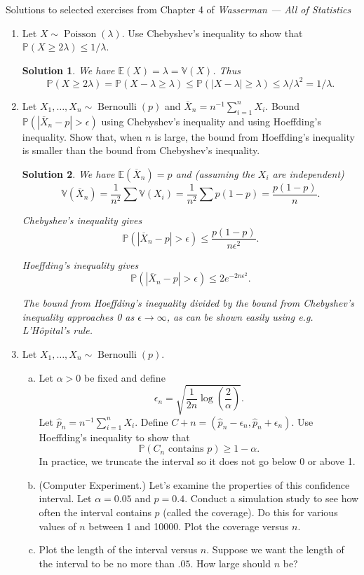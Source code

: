 \documentclass[10pt]{article}
\newtheorem*{sol}{Solution}
\renewcommand{\P}{\mathbb{P}}
\newcommand{\V}{\mathbb{V}}
\newcommand{\E}{\mathbb{E}}
\newcommand{\Bern}{\operatorname{Bernoulli}}
\newcommand{\Poiss}{\operatorname{Poisson}}
\begin{document}
\noindent \large{Solutions to selected exercises from Chapter 4 of
\emph{Wasserman --- All of Statistics}}

\begin{enumerate}
\item[(2)] Let $X\sim \Poiss(\lambda)$. Use Chebyshev's inequality to show that
$\P(X\geq 2\lambda) \leq 1/\lambda$.

\begin{sol}
We have $\E(X)=\lambda=\V(X)$. Thus
\[
\P(X\geq 2\lambda) =\P(X-\lambda\geq \lambda)\leq \P(|X-\lambda|\geq \lambda)
\leq \lambda / \lambda^2=1/\lambda.
\]
\end{sol}

\item[(3)] Let $X_1,\ldots,X_n\sim\Bern(p)$ and $\overline X_n = n^{-1}\sum_{i=1}^n X_i$.
Bound $\P(|\overline X_n - p|>\epsilon)$ using Chebyshev's inequality and
using Hoeffding's inequality.
Show that, when $n$ is large, the bound from Hoeffding's inequality is
smaller than the bound from Chebyshev's inequality.

\begin{sol}
We have $\E(\overline X_n)=p$ and (assuming the $X_i$ are independent)
\[
\V(\overline X_n) = \frac{1}{n^2} \sum \V(X_i) = \frac{1}{n^2} \sum p(1-p) =
\frac{p(1-p)}{n}.
\]

Chebyshev's inequality gives
\[
\P(|\overline X_n - p| > \epsilon) \leq \frac{p(1-p)}{n\epsilon^2}.
\]

Hoeffding's inequality gives
\[
\P(|\overline X_n - p| > \epsilon) \leq 2e^{-2n\epsilon^2}.
\]

The bound from Hoeffding's inequality divided by the bound from Chebyshev's
inequality approaches 0 as $\epsilon\to \infty$, as can be shown easily using
e.g. L'H\^opital's rule.
\end{sol}

\item[(4)] Let $X_1,\ldots,X_n \sim \Bern(p)$.
\begin{enumerate}[(a)]
\item Let $\alpha>0$ be fixed and define
\[
\epsilon_n = \sqrt{\frac{1}{2n}\log\left(\frac{2}{\alpha}\right)}.
\]
Let $\hat p_n = n^{-1} \sum_{i=1}^n X_i$.
Define $C+n=(\hat p_n - \epsilon_n, \hat p_n + \epsilon_n)$. Use Hoeffding's
inequality to show that
\[
\P(C_n \text{ contains } p) \geq 1-\alpha.
\]
In practice, we truncate the interval so it does not go below 0 or above 1.
\item (Computer Experiment.) Let's examine the properties of this confidence
interval. Let $\alpha=0.05$ and $p=0.4$. Conduct a simulation study
to see how often the interval contains $p$ (called the coverage). Do this
for various values of $n$ between 1 and 10000. Plot the coverage versus $n$.
\item Plot the length of the interval versus $n$. Suppose we want the length
of the interval to be no more than $.05$. How large should $n$ be?
\end{enumerate}


\end{enumerate}
\end{document}
